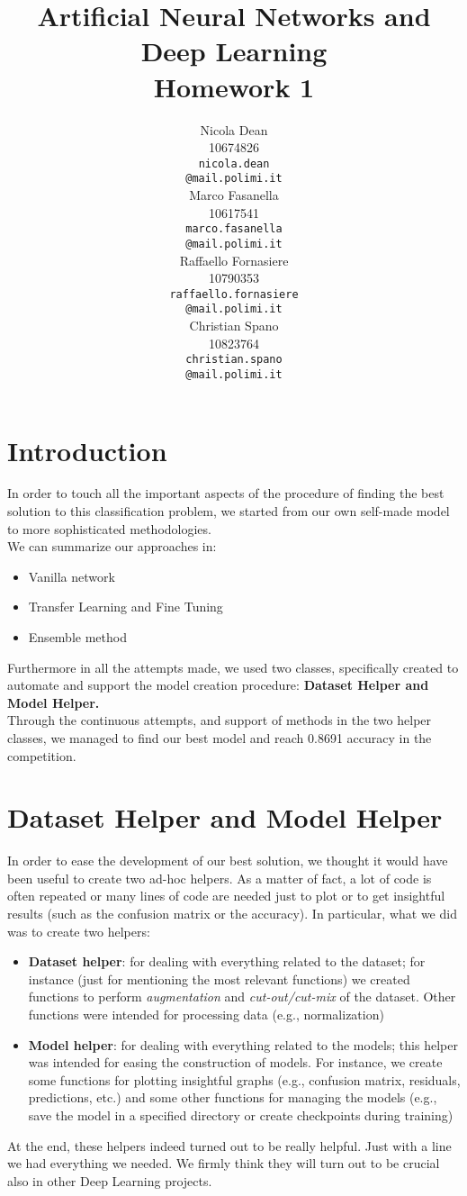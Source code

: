 \documentclass[10pt]{article}
\title{Artificial Neural Networks and Deep Learning \\
Homework 1}
\author{
  Nicola Dean \\
  10674826 \\
  {\tt nicola.dean \\
  \tt @mail.polimi.it} \\\And
  Marco Fasanella \\
  10617541 \\
  {\tt marco.fasanella \\
  \tt @mail.polimi.it} \\\And
  Raffaello Fornasiere \\
    10790353 \\
    {\tt raffaello.fornasiere \\
    \tt @mail.polimi.it} \\\And
  Christian Spano \\
  10823764 \\
  {\tt christian.spano \\
  \tt @mail.polimi.it} \\}
\date{}
\begin{document}
\maketitle



\section{Introduction}
In order to touch all the important aspects of the procedure of finding the best solution to this classification problem,
we started from our own self-made model to more sophisticated methodologies.\\
 We can summarize our approaches in:
\begin{itemize}
  \item Vanilla network
  \item Transfer Learning and Fine Tuning
  \item Ensemble method
\end{itemize}
Furthermore in all the attempts made, we used two classes, specifically created to automate and support the model creation
procedure: \textbf{Dataset Helper and Model Helper.}\\
Through the continuous attempts, and support of methods in the two helper classes, we managed to find our best model and
reach 0.8691 accuracy in the competition.


\section{Dataset Helper and Model Helper}
In order to ease the development of our best solution, we thought it would have been useful to create two ad-hoc helpers. As a matter of fact, a lot of code is often repeated or many lines of code are needed just to plot or to get insightful results (such as the confusion matrix or the accuracy). In particular, what we did was to create two helpers:
\begin{itemize}
    \item \textbf{Dataset helper}: for dealing with everything related to the dataset; for instance (just for mentioning the most relevant functions) we created functions to perform \textit{augmentation} and \textit{cut-out/cut-mix} of the dataset. Other functions were intended for processing data (e.g., normalization)
    \item \textbf{Model helper}: for dealing with everything related to the models; this helper was intended for easing the construction of models. For instance, we create some functions for plotting insightful graphs (e.g., confusion matrix, residuals, predictions, etc.) and some other functions for managing the models (e.g., save the model in a specified directory or create checkpoints during training)
\end{itemize}
At the end, these helpers indeed turned out to be really helpful. Just with a line we had everything we needed. We firmly think they will turn out to be crucial also in other Deep Learning projects.
\end{document}
